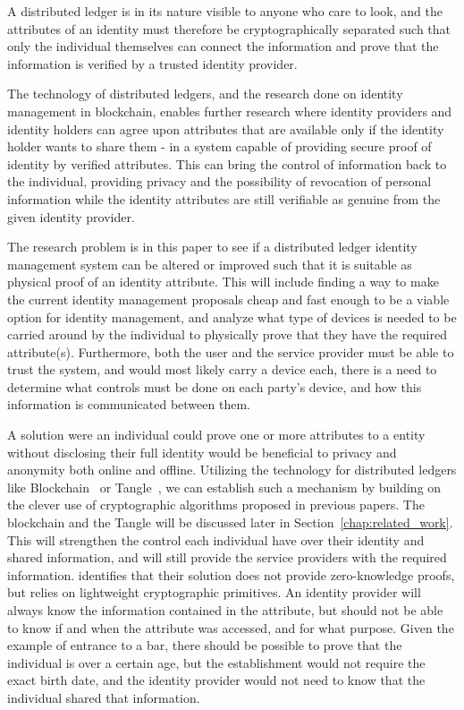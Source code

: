 A distributed ledger is in its nature visible to anyone who care to look, and the attributes of an identity must therefore be cryptographically separated such that only the individual themselves can connect the information and prove that the information is verified by a trusted identity provider. 

The technology of distributed ledgers, and the research done on identity management in blockchain, enables further research where identity providers and identity holders can agree upon attributes that are available only if the identity holder wants to share them - in a system capable of providing secure proof of identity by verified attributes. This can bring the control of information back to the individual, providing privacy and the possibility of revocation of personal information while the identity attributes are still verifiable as genuine from the given identity provider.

The research problem is in this paper to see if a distributed ledger identity management system can be altered or improved such that it is suitable as physical proof of an identity attribute. This will include finding a way to make the current identity management proposals cheap and fast enough to be a viable option for identity management, and analyze what type of devices is needed to be carried around by the individual to physically prove that they have the required attribute(s). Furthermore, both the user and the service provider must be able to trust the system, and would most likely carry a device each, there is a need to determine what controls must be done on each party's device, and how this information is communicated between them.

A solution were an individual could prove one or more attributes to a entity without disclosing their full identity would be beneficial to privacy and anonymity both online and offline. Utilizing the technology for distributed ledgers like Blockchain~\cite{bitcoin2008} or Tangle~\cite{IOTA_Whitepaper}, we can establish such a mechanism by building on the clever use of cryptographic algorithms proposed in previous papers. The blockchain and the Tangle will be discussed later in Section~\ref{chap:related_work}. This will strengthen the control each individual have over their identity and shared information, and will still provide the service providers with the required information. \cite{Azouvi2017} identifies that their solution does not provide zero-knowledge proofs, but relies on lightweight cryptographic primitives. An identity provider will always know the information contained in the attribute, but should not be able to know if and when the attribute was accessed, and for what purpose. Given the example of entrance to a bar, there should be possible to prove that the individual is over a certain age, but the establishment would not require the exact birth date, and the identity provider would not need to know that the individual shared that information.

